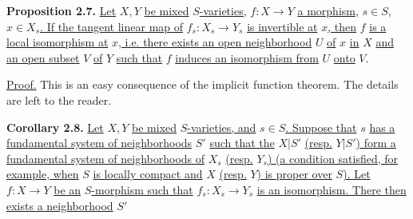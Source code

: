 \textbf{Proposition 2.7.} \uline{Let} $X,Y$ \uline{be mixed} $S$\uline{-varieties,} $f:X\to Y$ \uline{a morphism,} $s\in S$, $x\in X_s$\uline{. If the tangent linear map of} $f_s:X_s\to Y_s$ \uline{is invertible at} $x$\uline{, then} $f$ \uline{is a local isomorphism at} $x$\uline{, i.e. there exists an open neighborhood} $U$ \uline{of} $x$ \uline{in} $X$ \uline{and an open subset} $V$ \uline{of} $Y$ \uline{such that} $f$ \uline{induces an isomorphism from} $U$ \uline{onto} $V$.

\uline{Proof.} This is an easy consequence of the implicit function theorem. The details are left to the reader.

\textbf{Corollary 2.8.} \uline{Let} $X,Y$ \uline{be mixed} $S$\uline{-varieties, and} $s\in S$\uline{. Suppose that} $s$ \uline{has a fundamental system of neighborhoods} $S'$ \uline{such that the} $X|S'$ \uline{(resp.} $Y|S'$\uline{) form a fundamental system of neighborhoods of} $X_s$ \uline{(resp.} $Y_s$\uline{) (a condition satisfied, for example, when} $S$ \uline{is locally compact and} $X$ \uline{(resp.} $Y$\uline{) is proper over} $S$\uline{). Let} $f:X\to Y$ \uline{be an} $S$\uline{-morphism such that} $f_s:X_s\to Y_s$ \uline{is an isomorphism. There then exists a neighborhood} $S'$

